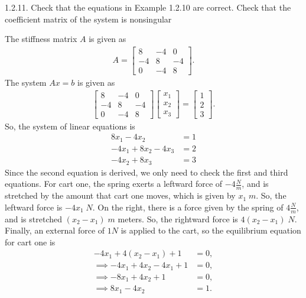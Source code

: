 \documentclass{report}
\begin{document}
    \bigbreak \noindent 
    \begin{mdframed}
        1.2.11. Check that the equations in Example 1.2.10 are correct. Check that the coefficient matrix of the system is nonsingular
    \end{mdframed}
    \bigbreak \noindent 
    The stiffness matrix $A$ is given as
    \begin{align*}
        A = \begin{bmatrix}
            8 & -4 & 0 \\
            -4 & 8 & -4 \\
            0 & -4 & 8
        \end{bmatrix}
    .\end{align*}
    The system $Ax = b$ is given as
        \begin{align*}
        \begin{bmatrix} 8 & -4 & 0 \\ -4 & 8 & -4 \\ 0 & -4 & 8 \end{bmatrix}
        \begin{bmatrix} x_{1} \\ x_{2} \\x_{3} \end{bmatrix}
         = 
         \begin{bmatrix} 1 \\ 2 \\ 3 \end{bmatrix}
    .\end{align*}
    So, the system of linear equations is 
    \begin{align*}
        8x_{1} -4x_{2} &= 1 \\
        -4x_{1} + 8x_{2} - 4x_{3} &= 2\\
        -4x_{2} + 8 x_{3} &= 3
    \end{align*}
    Since the second equation is derived, we only need to check the first and third equations.
    \bigbreak \noindent 
    For cart one, the spring exerts a leftward force of $-4 \frac{N}{m}$, and is stretched by the amount that cart one moves, which is given by $x_{1} \; m$. So, the leftward force is $-4x_{1}\; N$. On the right, there is a force given by the spring of $4 \frac{N}{m}$, and is stretched $(x_{2} - x_{1})\; m$ meters. So, the rightward force is $4(x_{2} - x_{1}) \; N$. Finally, an external force of $1N$ is applied to the cart, so the equilibrium equation for cart one is
    \begin{align*}
        -4x_{1} + 4(x_{2} - x_{1}) + 1 &= 0, \\
        \implies -4x_{1} + 4x_{2} - 4x_{1} + 1 &= 0, \\
        \implies -8x_{1} + 4x_{2} + 1 &= 0, \\
        \implies 8x_{1} -4x_{2} &= 1
    .\end{align*}
\end{document}
